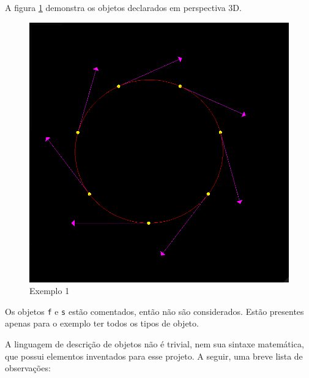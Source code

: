 A figura \ref{img:ex1} demonstra os objetos declarados em perspectiva 3D.
\begin{figure}[h!]
    \includegraphics[width=\linewidth]{ex1.png}
    \caption{Exemplo 1}
    \label{img:ex1}
\end{figure}

Os objetos \texttt{f} e \texttt{s} estão comentados, então não são considerados.
Estão presentes apenas para o exemplo ter todos os tipos de objeto.

A linguagem de descrição de objetos não é trivial, nem sua sintaxe matemática,
que possui elementos inventados para esse projeto.
A seguir, uma breve lista de observações:

